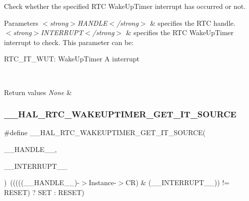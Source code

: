 Check whether the specified R\+TC Wake\+Up\+Timer interrupt has occurred or not. 


\begin{DoxyParams}{Parameters}
{\em $<$strong$>$\+H\+A\+N\+D\+L\+E$<$/strong$>$} & specifies the R\+TC handle. \\
\hline
{\em $<$strong$>$\+I\+N\+T\+E\+R\+R\+U\+P\+T$<$/strong$>$} & specifies the R\+TC Wake\+Up\+Timer interrupt to check. This parameter can be\+: \begin{DoxyItemize}
\item R\+T\+C\+\_\+\+I\+T\+\_\+\+W\+UT\+: Wake\+Up\+Timer A interrupt \end{DoxyItemize}
\\
\hline
\end{DoxyParams}

\begin{DoxyRetVals}{Return values}
{\em None} & \\
\hline
\end{DoxyRetVals}
\mbox{\label{group___r_t_c_ex___wake_up___timer_gafbe296c7719885437a245d5967194ac0}} 
\subsubsection{\texorpdfstring{\+\_\+\+\_\+\+H\+A\+L\+\_\+\+R\+T\+C\+\_\+\+W\+A\+K\+E\+U\+P\+T\+I\+M\+E\+R\+\_\+\+G\+E\+T\+\_\+\+I\+T\+\_\+\+S\+O\+U\+R\+CE}{\_\_HAL\_RTC\_WAKEUPTIMER\_GET\_IT\_SOURCE}}
{\footnotesize\ttfamily \#define \+\_\+\+\_\+\+H\+A\+L\+\_\+\+R\+T\+C\+\_\+\+W\+A\+K\+E\+U\+P\+T\+I\+M\+E\+R\+\_\+\+G\+E\+T\+\_\+\+I\+T\+\_\+\+S\+O\+U\+R\+CE(\begin{DoxyParamCaption}\item[{}]{\+\_\+\+\_\+\+H\+A\+N\+D\+L\+E\+\_\+\+\_\+,  }\item[{}]{\+\_\+\+\_\+\+I\+N\+T\+E\+R\+R\+U\+P\+T\+\_\+\+\_\+ }\end{DoxyParamCaption})~(((((\+\_\+\+\_\+\+H\+A\+N\+D\+L\+E\+\_\+\+\_\+)-\/$>$Instance-\/$>$CR) \& (\+\_\+\+\_\+\+I\+N\+T\+E\+R\+R\+U\+P\+T\+\_\+\+\_\+)) != R\+E\+S\+ET) ? S\+ET \+: R\+E\+S\+ET)}



